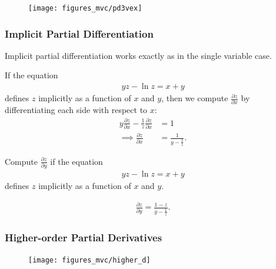 \documentclass[12pt,letterpaper,reqno]{article}
\numberwithin{equation}{section}
\begin{document}
{\begin{figure}[h]
	\begin{center}
		\texttt{[image: figures\_mvc/pd3vex]}
	\end{center}
\end{figure}

\subsubsection{Implicit Partial Differentiation}
Implicit partial differentiation works exactly as in the single variable case.

\begin{example}
If the equation
\begin{align*}
	yz-\ln z=x+y
\end{align*}	
defines $z$ implicitly as a function of $x$ and $y$, then we compute $\frac{\partial z}{\partial x}$ by differentiating each side with respect to $x$:
\begin{align*}
	y\frac{\partial z}{\partial x}-\frac{1}{z}\frac{\partial z}{\partial x}&=1 \\
	\implies \frac{\partial z}{\partial x}&=\frac{1}{y-\frac{1}{z}}.
\end{align*}
\end{example}

\begin{exercise}
	Compute $\frac{\partial z}{\partial y}$ if the equation
\begin{align*}
	yz-\ln z=x+y
\end{align*}	
defines $z$ implicitly as a function of $x$ and $y$.
\end{exercise}

{\color{red}
\begin{solution}
\begin{align*}
	\frac{\partial z}{\partial y}=\frac{1-z}{y-\frac{1}{z}}.
\end{align*}	
\end{solution}

}



\subsubsection{Higher-order Partial Derivatives}
\begin{figure}[h]
	\begin{center}
		\texttt{[image: figures\_mvc/higher\_d]}
	\end{center}
\end{figure}

}
\end{document}
